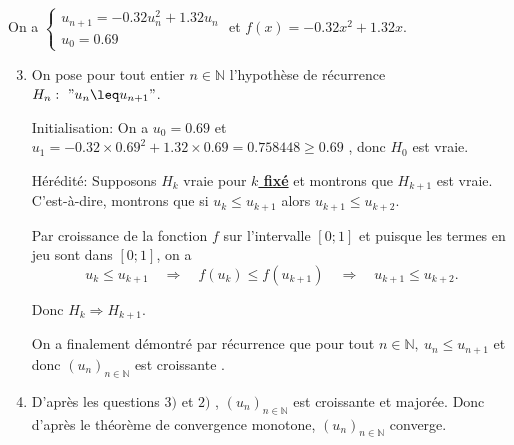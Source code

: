 \documentclass[15pt, mathserif]{beamer}
\begin{document}
\begin{frame}On a $\begin{cases} u_{n+1} = -0.32u_n^2+1.32u_n\\[1em] u_0 = 0.69\end{cases}$ et $f(x) = -0.32x^2+1.32x$.

\begin{enumerate}\setcounter{enumi}{2}

	\item On pose pour tout entier $n \in \mathbb{N}$ l'hypothèse de récurrence $H_n:~" u_n \leq u_{n+1}"$.

\medskip

Initialisation: On a $u_0 =0.69$ et $u_1 = -0.32\times0.69^2+1.32\times0.69 = 0.758448\geq 0.69$ , donc $H_0$ est vraie.

\medskip

Hérédité: Supposons $H_k$ vraie pour \textbf\underline{{$k$ fixé}} et montrons que $H_{k+1}$ est vraie. C'est-à-dire, montrons que si $u_k \leq  u_{k+1}$ alors $u_{k+1} \leq  u_{k+2}$.

 Par croissance de la fonction $f$ sur l'intervalle $[0;1]$ et puisque les termes en jeu sont dans $[0;1]$, on a \[ u_k \leq u_{k+1} \quad \Rightarrow \quad f(u_k) \leq  f(u_{k+1}) \quad \Rightarrow \quad  u_{k+1}\leq u_{k+2}. \]

Donc $H_{k} \Rightarrow H_{k+1}$.

 On a finalement démontré par récurrence que pour tout $n \in\mathbb{N},~ u_n \leq u_{n+1}$ et donc $(u_n)_{n\in\mathbb{N}}$ est  croissante .

\end{enumerate}
\end{frame}


\begin{frame}

\begin{enumerate}\setcounter{enumi}{3}

	\item D'après les questions $3)$ et $2)$ , $(u_n)_{n\in\mathbb{N}}$ est croissante et majorée. Donc d'après le théorème de convergence monotone, $(u_n)_{n\in\mathbb{N}}$ converge.

\end{enumerate}\end{frame}
\end{document}
